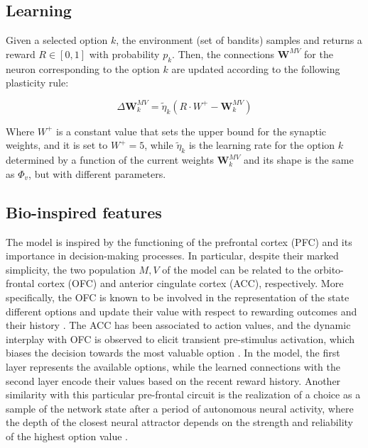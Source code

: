 \subsection{Learning}
Given a selected option $k$, the environment (set of bandits) samples and returns a reward $R\in [0, 1]$ with probability $p_{k}$.
Then, the connections $\textbf{W}^{MV}$ for the neuron corresponding to the option $k$ are updated according to the following plasticity rule:

\begin{equation}
    \Delta \textbf{W}^{MV}_{k} = \tilde{\eta}_{k} \left(R\cdot W^{+}- \textbf{W}^{MV}_{k}\right)
\end{equation}

\noindent
Where $W^{+}$ is a constant value that sets the upper bound for the synaptic weights, and it is set to $W^{+} = 5$, while $\tilde{\eta}_{k}$ is the learning rate for the option $k$ determined by a function of the current weights $\textbf{W}^{MV}_{k}$ and its shape is the same as $\Phi_{v}$, but with
different parameters.

\subsection{Bio-inspired features}

The model is inspired by the functioning of the prefrontal cortex (PFC) and its importance in decision-making processes. In particular, despite their marked simplicity, the two population $M, V$ of the model can be related to the orbito-frontal cortex (OFC) and anterior cingulate cortex (ACC), respectively.
More specifically, the OFC is known to be involved in the representation of the state different options and update their value with respect to rewarding outcomes and their history \cite{lukChoiceCodingFrontal2013, kennerleyDecisionMakingReward2011a}. The ACC has been associated to action values, and the dynamic interplay with OFC is observed to elicit
transient pre-stimulus activation, which biases the decision towards the most valuable option \cite{funahashiPrefrontalContributionDecisionMaking2017, marcosDeterminingMonkeyFree2016, balewskiValueDynamicsAffect2023}. In the model, the first layer represents the available options, while the learned
connections with the second layer encode their values based on the recent reward history. Another similarity with this particular pre-frontal circuit is the realization of a choice as a sample of the network state after a period of autonomous neural activity, where the depth of the closest
neural attractor depends on the strength and reliability of the highest option value \cite{backmanEffectsWorkingMemoryTraining2011, enelStableDynamicRepresentations2020}.

